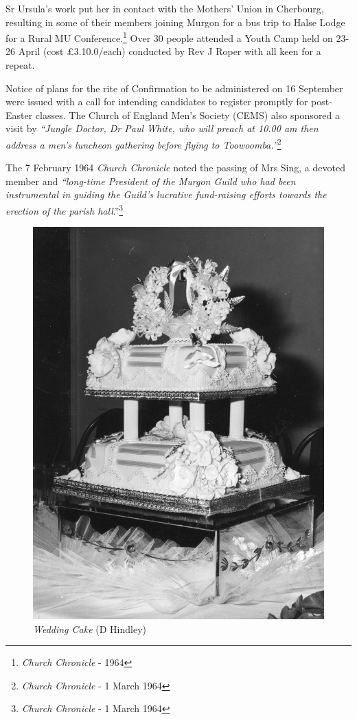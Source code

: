 Sr Ursula's work put her in contact with the Mothers' Union in Cherbourg, resulting in some of their members joining Murgon for a bus trip to Halse Lodge for a Rural MU Conference.\footnote{\emph{Church Chronicle} - 1964} Over 30 people attended a Youth Camp held on 23-26 April (cost \pounds3.10.0/each) conducted by Rev J Roper with all keen for a repeat.


Notice of plans for the rite of Confirmation to be administered on 16 September were issued with a call for intending candidates to register promptly for post-Easter classes. The Church of England Men's Society (CEMS) also sponsored a visit by \emph{``Jungle Doctor, Dr Paul White, who will preach at 10.00 am then address a men's luncheon gathering before flying to Toowoomba.''}\footnote{\emph{Church Chronicle} - 1 March 1964}


The 7 February 1964 \emph{Church Chronicle} noted the passing of Mrs Sing, a devoted member and \emph{``long-time President of the Murgon Guild who had been instrumental in guiding the Guild's lucrative fund-raising efforts towards the erection of the parish hall}.''\footnote{\emph{Church Chronicle} - 1 March 1964}








\begin{figure}
\begin{center}
\includegraphics[width=.5\linewidth,center]{../images/donnaWeddingCake.jpg}
\caption{{\itshape Wedding Cake} {\scriptsize(D Hindley)}}
\end{center}
\end{figure}





